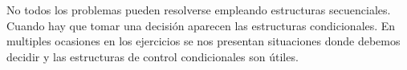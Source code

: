 No todos los problemas pueden resolverse empleando estructuras secuenciales. Cuando hay que tomar una decisión aparecen las estructuras condicionales. En multiples ocasiones en los ejercicios se nos presentan situaciones donde debemos decidir y las estructuras de control condicionales son útiles. 